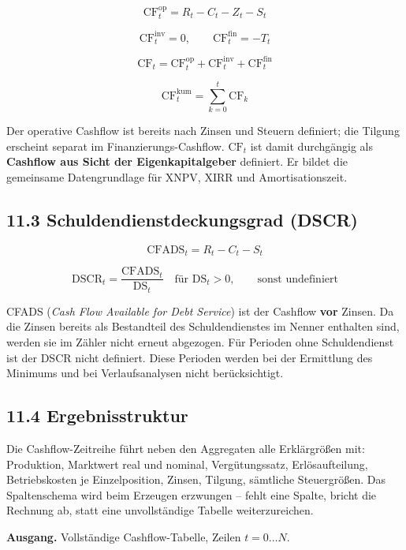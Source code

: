 \documentclass[
  a4paper,
  10pt]{article}
\begin{document}
\[ \mathrm{CF}^{\mathrm{op}}_t = R_t - C_t - Z_t - S_t \]

\[ \mathrm{CF}^{\mathrm{inv}}_t = 0, \qquad \mathrm{CF}^{\mathrm{fin}}_t = -T_t \]

\[ \mathrm{CF}_t = \mathrm{CF}^{\mathrm{op}}_t + \mathrm{CF}^{\mathrm{inv}}_t + \mathrm{CF}^{\mathrm{fin}}_t \]

\[ \mathrm{CF}^{\mathrm{kum}}_t = \sum_{k=0}^{t} \mathrm{CF}_k \]

Der operative Cashflow ist bereits nach Zinsen und Steuern definiert;
die Tilgung erscheint separat im Finanzierungs-Cashflow.
\(\mathrm{CF}_t\) ist damit durchgängig als \textbf{Cashflow aus Sicht
der Eigenkapitalgeber} definiert. Er bildet die gemeinsame
Datengrundlage für XNPV, XIRR und Amortisationszeit.

\hypertarget{schuldendienstdeckungsgrad-dscr}{%
\subsection{11.3 Schuldendienstdeckungsgrad
(DSCR)}\label{schuldendienstdeckungsgrad-dscr}}

\[ \mathrm{CFADS}_t = R_t - C_t - S_t \]

\[ \mathrm{DSCR}_t = \frac{\mathrm{CFADS}_t}{\mathrm{DS}_t} \quad \text{für } \mathrm{DS}_t > 0, \qquad \text{sonst undefiniert} \]

CFADS (\emph{Cash Flow Available for Debt Service}) ist der Cashflow
\textbf{vor} Zinsen. Da die Zinsen bereits als Bestandteil des
Schuldendienstes im Nenner enthalten sind, werden sie im Zähler nicht
erneut abgezogen. Für Perioden ohne Schuldendienst ist der DSCR nicht
definiert. Diese Perioden werden bei der Ermittlung des Minimums und bei
Verlaufsanalysen nicht berücksichtigt.

\hypertarget{ergebnisstruktur}{%
\subsection{11.4 Ergebnisstruktur}\label{ergebnisstruktur}}

Die Cashflow-Zeitreihe führt neben den Aggregaten alle Erklärgrößen mit:
Produktion, Marktwert real und nominal, Vergütungssatz, Erlösaufteilung,
Betriebskosten je Einzelposition, Zinsen, Tilgung, sämtliche
Steuergrößen. Das Spaltenschema wird beim Erzeugen erzwungen -- fehlt
eine Spalte, bricht die Rechnung ab, statt eine unvollständige Tabelle
weiterzureichen.

\textbf{Ausgang.} Vollständige Cashflow-Tabelle, Zeilen
\(t = 0 \dots N\).
\end{document}
